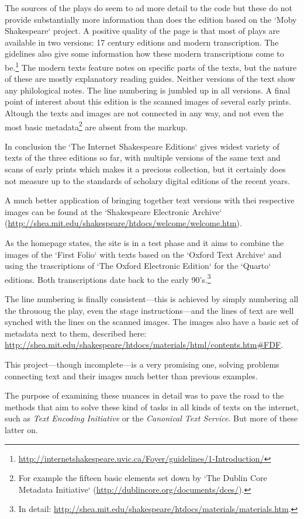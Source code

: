 The sources of the plays do seem to ad more detail to the code but these do not provide substantially more information than does the edition based on the `Moby Shakespeare` project. A positive quality of the page is  that most of plays are available in two versions: 17 century editions and modern transcription. The gidelines also give some information how these modern transcriptions come to be.\footnote{\url{http://internetshakespeare.uvic.ca/Foyer/guidelines/1-Introduction/}} The modern texts feature notes on specific parts of the texts, but the nature of these are mostly explanatory reading guides. Neither versions of the text show any philological notes. The line numbering is jumbled up in all versions.
A final point of interest about this edition is the scanned images of several early prints. Altough the texts and images are not connected in any way, and not even the most basic metadata\footnote{For example the fifteen basic elements set down by `The Dublin Core Metadata Initiative` (\url{http://dublincore.org/documents/dces/}).} are absent from the markup.

In conclusion the `The Internet Shakespeare Editions` gives widest variety of texts of the three editions so far, with multiple versions of the same text and scans of early prints which makes it a precious collection, but it certainly does not measure up to the standards of scholary digital editions of the recent years.

A much better application of bringing together text versions with thei respective images can be found at the `Shakespeare Electronic Archive` (\url{http://shea.mit.edu/shakespeare/htdocs/welcome/welcome.htm}).

As the homepage states, the site is in a test phase and it aims to combine the images of the `First Folio` with texts based on the `Oxford Text Archive` and using the trascriptions of `The Oxford Electronic Edition` for the `Quarto` editions. Both transcriptions date back to the early 90's.\footnote{In detail: \url{http://shea.mit.edu/shakespeare/htdocs/materials/materials.htm}.} 

The line numbering is finally consistent---this is achieved by simply numbering all the thrououg the play, even the stage instructions---and the lines of text are well synched with the lines on the scanned images. The images also have a basic set of metadata next to them, described here: \url{http://shea.mit.edu/shakespeare/htdocs/materials/html/contents.htm#FDF}.

This project---though incomplete---is a very promising one, solving problems connecting text and their images much better than previous examples.

The purpose of examining these nuances in detail was to pave the road to the methods that aim to solve these kind of tasks in all kinds of texts on the internet, such as \textit{Text Encoding Initiative} or the \textit{Canonical Text Service}. But more of these latter on. 